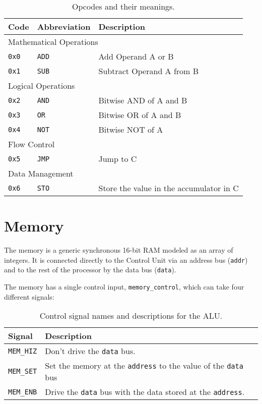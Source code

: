 \documentclass[a4paper]{article}
\begin{document}
\begin{table}[H]
\centering
\caption{Opcodes and their meanings.}
\begin{tabular}{lll}
Code & Abbreviation & Description \\
\hline
\multicolumn{3}{l}{Mathematical Operations} \\
\texttt{0x0} & \texttt{ADD} & Add Operand A or B \\
\texttt{0x1} & \texttt{SUB} & Subtract Operand A from B \\
\hline
\multicolumn{3}{l}{Logical Operations} \\
\texttt{0x2} & \texttt{AND} & Bitwise AND of A and B \\
\texttt{0x3} & \texttt{OR}  & Bitwise OR of A and B \\
\texttt{0x4} & \texttt{NOT} & Bitwise NOT of A \\
\hline
\multicolumn{3}{l}{Flow Control} \\
\texttt{0x5} & \texttt{JMP} & Jump to C \\
\hline
\multicolumn{3}{l}{Data Management} \\
\texttt{0x6} & \texttt{STO} & Store the value in the accumulator in C \\
\end{tabular}
\end{table}

\section{Memory}

The memory is a generic synchronous 16-bit RAM modeled as an array of integers. It is connected directly to the Control Unit via an address bus (\verb|addr|) and to the rest of the processor by the data bus (\verb|data|).

The memory has a single control input, \verb|memory_control|, which can take four different signals:

\begin{table}[H]
\centering
\caption{Control signal names and descriptions for the ALU.}
\begin{tabular}{ll}
	Signal & Description \\
	\hline
	\texttt{MEM\_HIZ} & Don't drive the \texttt{data} bus.\\
	\texttt{MEM\_SET} & Set the memory at the \texttt{address} to the value of the \texttt{data} bus \\
	\texttt{MEM\_ENB} & Drive the \texttt{data} bus with the data stored at the \texttt{address}.\\
\end{tabular}
\end{table}
\end{document}
